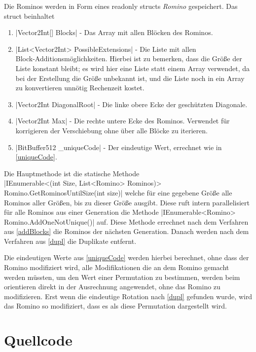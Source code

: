 \documentclass[a4paper,10pt,ngerman]{scrartcl}
\begin{document}
Die Rominos werden in Form eines readonly structs \textit{Romino} gespeichert.
Das struct beinhaltet

\begin{enumerate}
    \item |Vector2Int[] Blocks| - 
        Das Array mit allen Blöcken des Rominos.
    \item |List<Vector2Int> PossibleExtensions| - 
        Die Liste mit allen \\ Block-Additionsmöglichkeiten.
        Hierbei ist zu bemerken, dass die Größe der Liste konstant bleibt;
        es wird hier eine Liste statt einem Array verwendet, da bei der
        Erstellung die Größe unbekannt ist, und die Liste noch in ein Array
        zu konvertieren unnötig Rechenzeit kostet.
    \item |Vector2Int DiagonalRoot| - Die linke obere Ecke der 
        geschützten Diagonale.
    \item |Vector2Int Max| - Die rechte untere Ecke des Rominos.
        Verwendet für korrigieren der Verschiebung ohne über alle Blöcke zu
        iterieren.
    \item |BitBuffer512 \_uniqueCode| - Der eindeutige Wert, errechnet
        wie in \cref{uniqueCode}.
\end{enumerate}

Die Hauptmethode ist die statische Methode\\
|IEnumerable<(int Size, List<Romino> Rominos)> Romino.GetRominosUntilSize(int size)|
welche für eine gegebene Größe alle Rominos aller Größen, bis zu dieser
Größe ausgibt. Diese ruft intern parallelisiert für alle Rominos aus einer
Generation die Methode |IEnumerable<Romino> Romino.AddOneNotUnique()|
auf.
Diese Methode errechnet nach dem Verfahren aus \cref{addBlocks} die
Rominos der nächsten Generation.
Danach werden nach dem Verfahren aus \cref{dupl} die Duplikate entfernt.

Die eindeutigen Werte aus \cref{uniqueCode} werden hierbei berechnet, ohne
dass der Romino modifiziert wird, alle Modifikationen die an dem Romino
gemacht werden müssten, um den Wert einer Permutation zu bestimmen, werden
beim orientieren direkt in der Ausrechnung angewendet, ohne das Romino zu
modifizieren. Erst wenn die eindeutige Rotation nach \cref{dupl} gefunden
wurde, wird das Romino so modifiziert, dass es als diese Permutation
dargestellt wird.

\section{Quellcode}
\end{document}
